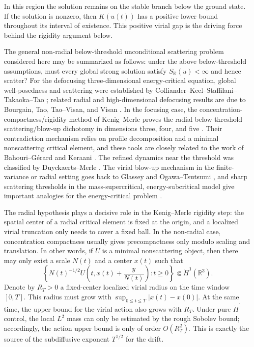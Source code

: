 \documentclass[10pt,a4paper]{amsart}
\numberwithin{equation}{section}
\newcommand{\R}{\mathbb R}
\begin{document}
In this region the solution remains on the stable branch below the ground state. If the solution is nonzero, then $K(u(t))$ has a positive lower bound throughout its interval of existence. This positive virial gap is the driving force behind the rigidity argument below.

The general non-radial below-threshold unconditional scattering problem considered here may be summarized as follows: under the above below-threshold assumptions, must every global strong solution satisfy $S_\R(u)<\infty$ and hence scatter? For the defocusing three-dimensional energy-critical equation, global well-posedness and scattering were established by Colliander--Keel--Staffilani--Takaoka--Tao \cite{CKSTT2008}; related radial and high-dimensional defocusing results are due to Bourgain, Tao, Tao--Visan, and Visan \cite{Bourgain1999,Tao2005,TaoVisan2005,Visan2007}. In the focusing case, the concentration-compactness/rigidity method of Kenig--Merle proves the radial below-threshold scattering/blow-up dichotomy in dimensions three, four, and five \cite{KenigMerle2006}. Their contradiction mechanism relies on profile decomposition and a minimal nonscattering critical element, and these tools are closely related to the work of Bahouri--G\'erard and Keraani \cite{BahouriGerard1999,Keraani2001}. The refined dynamics near the threshold was classified by Duyckaerts--Merle \cite{DuyckaertsMerle2009}. The virial blow-up mechanism in the finite-variance or radial setting goes back to Glassey and Ogawa--Tsutsumi \cite{Glassey1977,OgawaTsutsumi1991}, and sharp scattering thresholds in the mass-supercritical, energy-subcritical model give important analogies for the energy-critical problem \cite{HolmerRoudenko2008,DuyckaertsHolmerRoudenko2008}.

The radial hypothesis plays a decisive role in the Kenig--Merle rigidity step: the spatial center of a radial critical element is fixed at the origin, and a localized virial truncation only needs to cover a fixed ball. In the non-radial case, concentration compactness usually gives precompactness only modulo scaling and translation. In other words, if $U$ is a minimal nonscattering object, then there may only exist a scale $N(t)$ and a center $x(t)$ such that
\[
  \left\{N(t)^{-1/2}U\left(t,x(t)+\frac{y}{N(t)}\right):t\ge0\right\}
  \Subset\dot H^1(\R^3).
\]
Denote by $R_T>0$ a fixed-center localized virial radius on the time window $[0,T]$. This radius must grow with $\sup_{0\le t\le T}|x(t)-x(0)|$. At the same time, the upper bound for the virial action also grows with $R_T$. Under pure $\dot H^1$ control, the local $L^2$ mass can only be estimated by the rough Sobolev bound; accordingly, the action upper bound is only of order $O(R_T^2)$. This is exactly the source of the subdiffusive exponent $T^{1/2}$ for the drift.
\end{document}
